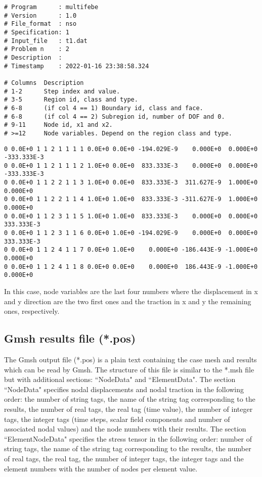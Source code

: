 \documentclass[A4]{article}
\begin{document}
\begin{Verbatim}
# Program      : multifebe
# Version      : 1.0
# File_format  : nso
# Specification: 1
# Input_file   : t1.dat
# Problem n    : 2
# Description  : 
# Timestamp    : 2022-01-16 23:38:58.324

# Columns  Description
# 1-2      Step index and value.
# 3-5      Region id, class and type.
# 6-8      (if col 4 == 1) Boundary id, class and face.
# 6-8      (if col 4 == 2) Subregion id, number of DOF and 0.
# 9-11     Node id, x1 and x2.
# >=12     Node variables. Depend on the region class and type.
\end{Verbatim}

\begin{Verbatim}
0 0.0E+0 1 1 2 1 1 1 1 0.0E+0 0.0E+0 -194.029E-9    0.000E+0  0.000E+0 -333.333E-3
0 0.0E+0 1 1 2 1 1 1 2 1.0E+0 0.0E+0  833.333E-3    0.000E+0  0.000E+0 -333.333E-3	
0 0.0E+0 1 1 2 2 1 1 3 1.0E+0 0.0E+0  833.333E-3  311.627E-9  1.000E+0    0.000E+0
0 0.0E+0 1 1 2 2 1 1 4 1.0E+0 1.0E+0  833.333E-3 -311.627E-9  1.000E+0    0.000E+0
0 0.0E+0 1 1 2 3 1 1 5 1.0E+0 1.0E+0  833.333E-3    0.000E+0  0.000E+0  333.333E-3
0 0.0E+0 1 1 2 3 1 1 6 0.0E+0 1.0E+0 -194.029E-9    0.000E+0  0.000E+0  333.333E-3
0 0.0E+0 1 1 2 4 1 1 7 0.0E+0 1.0E+0    0.000E+0 -186.443E-9 -1.000E+0    0.000E+0
0 0.0E+0 1 1 2 4 1 1 8 0.0E+0 0.0E+0    0.000E+0  186.443E-9 -1.000E+0    0.000E+0
\end{Verbatim}

In this case, node variables are the last four numbers where the displacement in x and y direction are the two first ones and the traction in x and y the remaining ones, respectively. 

\subsection{Gmsh results file (*.pos)}

The Gmsh output file (*.pos) is a plain text containing the case mesh and results which can be read by Gmsh. The structure of this file is similar to the *.msh file but with additional sections: ``NodeData" and ``ElementData". The section ``NodeData" specifies nodal displacements and nodal traction in the following order: the number of string tags, the name of the string tag corresponding to the results, the number of real tags, the real tag (time value), the number of integer tags, the integer tags (time steps, scalar field components and number of associated nodal values) and the node numbers with their results. The section ``ElementNodeData" specifies the stress tensor in the following order: number of string tags, the name of the string tag corresponding to the results, the number of real tags, the real tag, the number of integer tags, the integer tags and the element numbers with the number of nodes per element value.
\end{document}

